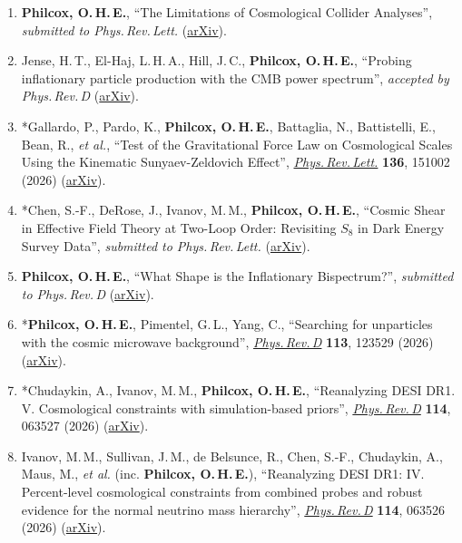 \begin{enumerate}
    \item \textbf{Philcox, O.\,H.\,E.}, ``The Limitations of Cosmological Collider Analyses'', \textit{submitted to Phys.\,Rev.\,Lett.} (\href{https://arxiv.org/abs/2607.12010}{arXiv}).
    \item Jense, H.\,T., El-Haj, L.\,H.\,A., Hill, J.\,C., \textbf{Philcox, O.\,H.\,E.}, ``Probing inflationary particle production with the CMB power spectrum'', \textit{accepted by Phys.\,Rev.\,D} (\href{https://arxiv.org/abs/2606.26823}{arXiv}).
    \item *Gallardo, P., Pardo, K., \textbf{Philcox, O.\,H.\,E.}, Battaglia, N., Battistelli, E., Bean, R., \textit{et al.}, ``Test of the Gravitational Force Law on Cosmological Scales Using the Kinematic Sunyaev-Zeldovich Effect'', \href{https://doi.org/10.1103/rk8v-rcm3}{\textit{Phys.\,Rev.\,Lett.}} \textbf{136}, 151002 (2026) (\href{https://arxiv.org/abs/2604.14327}{arXiv}).
    \item *Chen, S.-F., DeRose, J., Ivanov, M.\,M., \textbf{Philcox, O.\,H.\,E.}, ``Cosmic Shear in Effective Field Theory at Two-Loop Order: Revisiting $S_8$ in Dark Energy Survey Data'', \textit{submitted to Phys.\,Rev.\,Lett.} (\href{https://arxiv.org/abs/2603.28761}{arXiv}).
    \item \textbf{Philcox, O.\,H.\,E.}, ``What Shape is the Inflationary Bispectrum?'', \textit{submitted to Phys.\,Rev.\,D} (\href{https://arxiv.org/abs/2603.17004}{arXiv}).
    \item *\textbf{Philcox, O.\,H.\,E.}, Pimentel, G.\,L., Yang, C., ``Searching for unparticles with the cosmic microwave background'', \href{https://doi.org/10.1103/9v18-45wb}{\textit{Phys.\,Rev.\,D}} \textbf{113}, 123529 (2026) (\href{https://arxiv.org/abs/2603.13486}{arXiv}).
    \item *Chudaykin, A., Ivanov, M.\,M., \textbf{Philcox, O.\,H.\,E.}, ``Reanalyzing DESI DR1. V. Cosmological constraints with simulation-based priors'', \href{https://doi.org/10.1103/lg1n-k1rl}{\textit{Phys.\,Rev.\,D}} \textbf{114}, 063527 (2026) (\href{https://arxiv.org/abs/2602.18554}{arXiv}).
    \item Ivanov, M.\,M., Sullivan, J.\,M., de Belsunce, R., Chen, S.-F., Chudaykin, A., Maus, M., \textit{et al.} (inc.\,\,\textbf{Philcox, O.\,H.\,E.}), ``Reanalyzing DESI DR1: IV. Percent-level cosmological constraints from combined probes and robust evidence for the normal neutrino mass hierarchy'', \href{https://doi.org/10.1103/sjff-yj2t}{\textit{Phys.\,Rev.\,D}} \textbf{114}, 063526 (2026) (\href{https://arxiv.org/abs/2601.16165}{arXiv}).

\end{enumerate}
